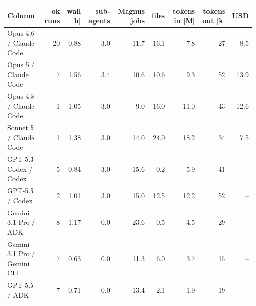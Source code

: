 \begin{tabular}{lrrrrrrrr}
\toprule
Column & ok runs & wall [h] & sub-agents & Magnus jobs & files & tokens in [M] & tokens out [k] & USD \\
\midrule
Opus 4.6 / Claude Code & 20 & 0.88 & 3.0 & 11.7 & 16.1 & 7.8 & 27 & 8.5 \\
Opus 5 / Claude Code & 7 & 1.56 & 3.4 & 10.6 & 10.6 & 9.3 & 52 & 13.9 \\
Opus 4.8 / Claude Code & 1 & 1.05 & 3.0 & 9.0 & 16.0 & 11.0 & 43 & 12.6 \\
Sonnet 5 / Claude Code & 1 & 1.38 & 3.0 & 14.0 & 24.0 & 18.2 & 34 & 7.5 \\
GPT-5.3-Codex / Codex & 5 & 0.84 & 3.0 & 15.6 & 0.2 & 5.9 & 41 & -- \\
GPT-5.5 / Codex & 2 & 1.01 & 3.0 & 15.0 & 12.5 & 12.2 & 52 & -- \\
Gemini 3.1 Pro / ADK & 8 & 1.17 & 0.0 & 23.6 & 0.5 & 4.5 & 29 & -- \\
Gemini 3.1 Pro / Gemini CLI & 7 & 0.63 & 0.0 & 11.3 & 6.0 & 3.7 & 15 & -- \\
GPT-5.5 / ADK & 7 & 0.71 & 0.0 & 13.4 & 2.1 & 1.9 & 19 & -- \\
\bottomrule
\end{tabular}
